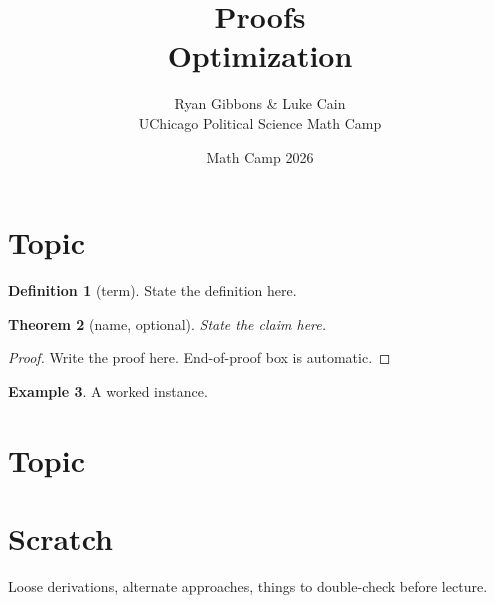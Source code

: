 \documentclass[11pt]{article}
\title{Proofs \\[0.35em] \large Optimization}
\author{Ryan Gibbons \& Luke Cain \\ UChicago Political Science Math Camp}
\date{Math Camp 2026}
\theoremstyle{plain}
\newtheorem{theorem}{Theorem}[section]
\newtheorem{lemma}[theorem]{Lemma}
\theoremstyle{definition}
\newtheorem{definition}[theorem]{Definition}
\newtheorem{example}[theorem]{Example}
\theoremstyle{remark}
\begin{document}
\maketitle


\section{Topic}

\begin{definition}[term]
State the definition here.
\end{definition}

\begin{theorem}[name, optional]
State the claim here.
\end{theorem}

\begin{proof}
Write the proof here.  End-of-proof box is automatic.
\end{proof}

\begin{example}
A worked instance.
\end{example}


\section{Topic}



\section*{Scratch}

Loose derivations, alternate approaches, things to double-check before lecture.
\end{document}
